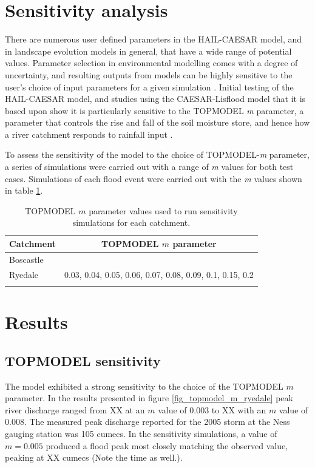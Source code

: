 \section{Sensitivity analysis}
There are numerous user defined parameters in the HAIL-CAESAR model, and in landscape evolution models in general, that have a wide range of potential values. Parameter selection in environmental modelling comes with a degree of uncertainty, and resulting outputs from models can be highly sensitive to the user's choice of input parameters for a given simulation \citep{Pelletier2012}. Initial testing of the HAIL-CAESAR model, and studies using the CAESAR-Lisflood model that it is based upon show it is particularly sensitive to the TOPMODEL \textit{m} parameter, a parameter that controls the rise and fall of the soil moisture store, and hence how a river catchment responds to rainfall input \citep{beven1979physically}. 

To assess the sensitivity of the model to the choice of TOPMODEL-\textit{m} parameter, a series of simulations were carried out with a range of \textit{m} values for both test cases. Simulations of each flood event were carried out with the \textit{m} values shown in table \ref{table-m-sens}.

\begin{table}
\begin{tabular}{lc}
\textbf{Catchment} & \textbf{TOPMODEL \(m\) parameter} \\
\hline
Boscastle  &                                            \\
Ryedale     & 0.03, 0.04, 0.05, 0.06, 0.07, 0.08, 0.09, 0.1, 0.15, 0.2  \\
\hline
\\ 
\end{tabular}
\caption{TOPMODEL \(m\) parameter values used to run sensitivity simulations for each catchment.}
\label{table-m-sens}
\end{table}

\section{Results}

\subsection{TOPMODEL sensitivity}

The model exhibited a strong sensitivity to the choice of the TOPMODEL \( m\) parameter. In the results presented in figure \ref{fig_topmodel_m_ryedale} peak river discharge ranged from XX at an \(m\) value of 0.003 to XX with an \(m\) value of 0.008. The measured peak discharge reported for the 2005 storm at the Ness gauging station was 105 cumecs. In the sensitivity simulations, a value of \(m = 0.005\) produced a flood peak most closely matching the observed value, peaking at XX cumecs (Note the time as well.). 


